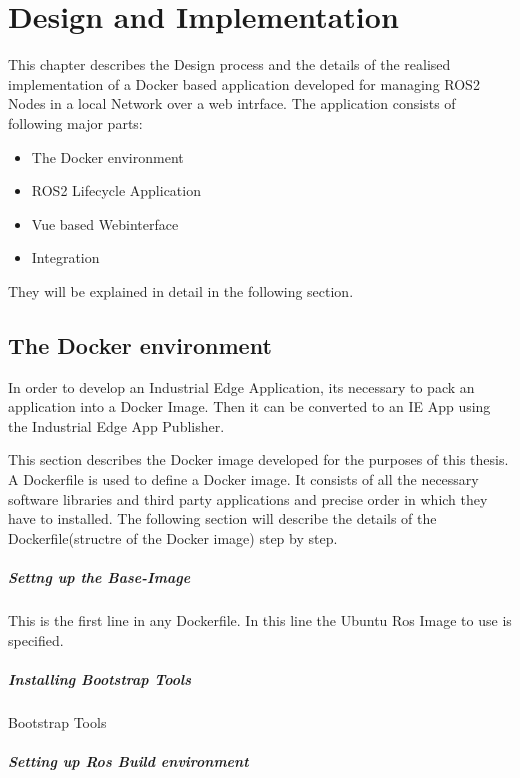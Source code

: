 \chapter{Design and Implementation}
\label{Implementation}

This chapter describes the Design process and the details of the realised implementation of a Docker based application developed for managing ROS2 Nodes in a local Network over a web intrface. The application consists of following major parts:

\begin{itemize}
	\item The Docker environment
	\item ROS2 Lifecycle Application
	\item Vue based Webinterface
	\item Integration
\end{itemize}

They will be explained in detail in the following section.

\section{The Docker environment}
\label{Implementierung:DockerEnvironment}
In order to develop an Industrial Edge Application, its necessary to pack an application into a Docker Image. Then it can be converted to an IE App using the Industrial Edge App Publisher.

This section describes the Docker image developed for the purposes of this thesis. A Dockerfile is used to define a Docker image. It consists of all the necessary software libraries and third party applications and precise order in which they have to installed. The following section will describe the details of the Dockerfile(structre of the Docker image) step by step.

\paragraph{Settng up the Base-Image} This is the first line in any Dockerfile. In this line the Ubuntu Ros Image to use is specified.

\paragraph{Installing Bootstrap Tools} Bootstrap Tools

\paragraph{Setting up Ros Build environment}
